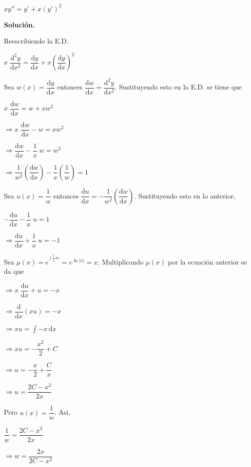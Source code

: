 \documentclass[fleqn]{article}
\begin{document}
    $ xy'' =  y' + x(y')^2 $

    \textbf{Solución.}

    Reescribiendo la E.D.

    $ x \; \dfrac{\mathrm{d}^2 y}{\mathrm{d}x^2} = \dfrac{\mathrm{d} y}{\mathrm{d}x} + x \left( \dfrac{\mathrm{d} y}{\mathrm{d}x} \right)^2 $

    Sea $ w(x) = \dfrac{\mathrm{d} y}{\mathrm{d}x} $ entonces $ \dfrac{\mathrm{d} w}{\mathrm{d}x} = \dfrac{\mathrm{d}^2 y}{\mathrm{d}x^2} $. Sustituyendo esto en la E.D. se tiene que

    $ x \; \dfrac{\mathrm{d} w}{\mathrm{d}x} = w + xw^2 $

    $ \Longrightarrow x \; \dfrac{\mathrm{d} w}{\mathrm{d}x} - w = xw^2 $

    $ \Longrightarrow \dfrac{\mathrm{d} w}{\mathrm{d}x} - \dfrac{1}{x} \; w = w^2 $

    $ \Longrightarrow \dfrac{1}{w^2} \left( \dfrac{\mathrm{d} w}{\mathrm{d}x} \right) - \dfrac{1}{x} \left( \dfrac{1}{w} \right) = 1 $

    Sea $ u(x) = \dfrac{1}{w} $ entonces $ \dfrac{\mathrm{d} u}{\mathrm{d}x} = - \dfrac{1}{w^2} \left( \dfrac{\mathrm{d} w}{\mathrm{d}x} \right) $. Sustituyendo esto en lo anterior,

    $ - \dfrac{\mathrm{d} u}{\mathrm{d}x} - \dfrac{1}{x} \; u = 1 $

    $ \Longrightarrow \dfrac{\mathrm{d} u}{\mathrm{d}x} + \dfrac{1}{x} \; u = -1 $

    Sea $ \mu (x) = e^{^{\displaystyle \int \dfrac{1}{x} \, \mathrm{d}x}} = e^{\displaystyle \ln |x|} = x $. Multiplicando $ \mu (x) $ por la ecuación anterior se da que

    $ \Longrightarrow x \; \dfrac{\mathrm{d} u}{\mathrm{d}x} + u = -x $

    $ \Longrightarrow \dfrac{\mathrm{d}}{\mathrm{d}x} (xu) = -x $

    $ \Longrightarrow xu = \int -x \, \mathrm{d}x $

    $ \Longrightarrow xu = - \dfrac{x^2}{2} + C $

    $ \Longrightarrow u = - \dfrac{x}{2} + \dfrac{C}{x} $

    $ \Longrightarrow u = \dfrac{2C - x^2}{2x} $

    Pero $ u(x) = \dfrac{1}{w} $. Asi, 

    $ \dfrac{1}{w} = \dfrac{2C - x^2}{2x} $

    $ \Longrightarrow w = \dfrac{2x}{2C - x^2} $
\end{document}
